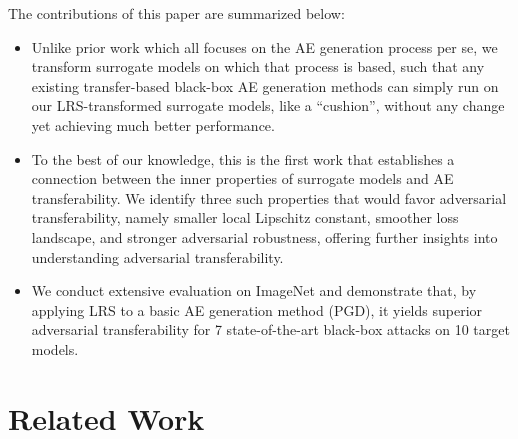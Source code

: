 \documentclass[letterpaper]{article} %
\theoremstyle{plain}
\theoremstyle{definition}
\begin{document}
The contributions of this paper are summarized below:

\begin{itemize}

    \item Unlike prior work which all focuses on the AE generation process per se, we transform surrogate models on which that process is based, such that any existing transfer-based black-box AE generation methods can simply run on our LRS-transformed surrogate models, like a ``cushion'', without any change yet achieving much better performance.

    \item To the best of our knowledge, this is the first work that establishes a connection between the inner properties of surrogate models and AE transferability. We identify three such properties that would favor adversarial transferability, namely smaller local Lipschitz constant, smoother loss landscape, and stronger adversarial robustness, offering further insights into understanding adversarial transferability.
    
    \item We conduct extensive evaluation on ImageNet and demonstrate that, by applying LRS to a basic AE generation method (PGD), it yields superior adversarial transferability for 7 state-of-the-art black-box attacks on 10 target models.
\end{itemize}

\section{Related Work}
\end{document}
